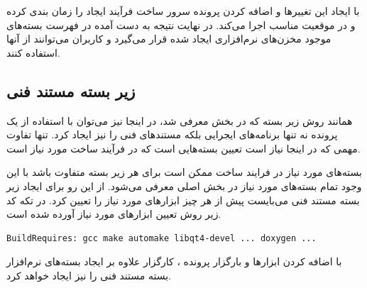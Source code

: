 با ایجاد این تغییرها و اضافه کردن پرونده  سرور ساخت فرآیند ایجاد را
زمان بندی کرده و در موقعیت مناسب اجرا می‌کند. در نهایت نتیجه به دست آمده در
فهرست بسته‌های موجود مخزن‌های نرم‌افزاری ایجاد شده قرار می‌گیرد و کاربران می‌توانند
از آنها استفاده کنند.

\subsection{زیر بسته مستند فنی}

همانند روش زیر بسته که در بخش   معرفی شد، در اینجا نیز می‌توان با
استفاده از یک پرونده  نه تنها برنامه‌های ایجرایی بلکه مستندهای فنی را
نیز ایجاد کرد. تنها تفاوت مهمی که در اینجا نیاز است تعیین بسته‌هایی است که در
فرآیند ساخت مورد نیاز است.

بسته‌های مورد نیاز در فرایند ساخت ممکن است برای هر زیر بسته متفاوت باشد با این
وجود تمام بسته‌های مورد نیاز در بخش اصلی معرفی می‌شود. از این رو برای ایجاد زیر
بسته مستند فنی می‌بایست پیش از هر چیز ابزارهای مورد نیاز را تعیین کرد. در تکه کد
زیر روش تعیین ابزارهای مورد نیاز آورده شده است.

\begin{latin}
\lstset{language=C++}
\begin{lstlisting}[frame=single]
BuildRequires: gcc make automake libqt4-devel ... doxygen ...
\end{lstlisting}
\end{latin}

با اضافه کردن ابزارها و بارگزار پرونده ، کارگزار علاوه بر ایجاد
بسته‌های نرم‌افزار بسته مستند فنی را نیز ایجاد خواهد کرد.
